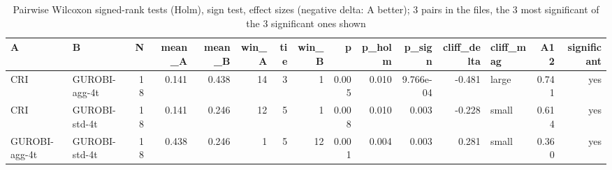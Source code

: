 \begin{table}[htbp]
\centering
\small
\caption{Pairwise Wilcoxon signed-rank tests (Holm), sign test, effect sizes (negative delta: A better); 3 pairs in the files, the 3 most significant of the 3 significant ones shown}
\label{tab:E7_gurobi_threads_b60_pairwise}
\begin{tabular}{llrrrrrrrrrrlrr}
\toprule
A & B & N & mean\_A & mean\_B & win\_A & tie & win\_B & p & p\_holm & p\_sign & cliff\_delta & cliff\_mag & A12 & significant \\
\midrule
CRI & GUROBI-agg-4t & 18 & 0.141 & 0.438 & 14 & 3 & 1 & 0.005 & 0.010 & 9.766e-04 & -0.481 & large & 0.741 & yes \\
CRI & GUROBI-std-4t & 18 & 0.141 & 0.246 & 12 & 5 & 1 & 0.008 & 0.010 & 0.003 & -0.228 & small & 0.614 & yes \\
GUROBI-agg-4t & GUROBI-std-4t & 18 & 0.438 & 0.246 & 1 & 5 & 12 & 0.001 & 0.004 & 0.003 & 0.281 & small & 0.360 & yes \\
\bottomrule
\end{tabular}
\end{table}
